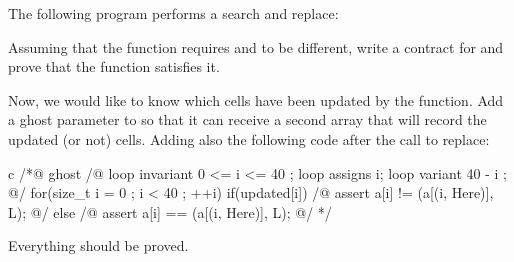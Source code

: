 

The following program performs a search and replace:




Assuming that the function  requires  and
 to be different, write a contract for 
and prove that the function satisfies it.


Now, we would like to know which cells have been updated by the function.
Add a ghost parameter to  so that it can receive a
second array that will record the updated (or not) cells. Adding also the
following code after the call to replace:


\begin{CodeBlock}{c}
/*@ ghost
  /@ loop invariant 0 <= i <= 40 ;
     loop assigns i;
     loop variant 40 - i ;
  @/
  for(size_t i = 0 ; i < 40 ; ++i){
    if(updated[i]){
      /@ assert a[i] != \at(a[\at(i, Here)], L); @/
    } else {
      /@ assert a[i] == \at(a[\at(i, Here)], L); @/
    }
  }
*/
\end{CodeBlock}


Everything should be proved.



